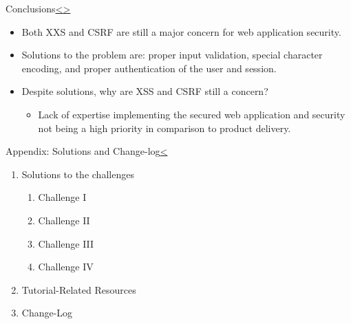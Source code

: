 \documentclass[12pt]{extarticle}
\newenvironment{instructionblock}{\Large\bgroup}{\egroup}
\newcommand{\ben}{\begin{enumerate}}
\newcommand{\een}{\end{enumerate}}
\begin{document}


\pagebreak
\begin{slide}{Conclusions}{\hyperref[slide 20]{\textless}\hyperref[slide 22]{\textgreater}}
	\begin{instructionblock}
		\begin{itemize}
			\item Both XXS and CSRF are still a major concern for web application security.
			\item Solutions to the problem are: proper input validation, special character encoding, and proper authentication of the user and session. 
			\item Despite solutions, why are XSS and CSRF still a concern?
			\begin{itemize}
				\item Lack of expertise implementing the secured web application and security not being a high priority in comparison to product delivery.
			\end{itemize}
		\end{itemize}
	\end{instructionblock}	
\end{slide}






\pagebreak	
\begin{slide}{Appendix: Solutions and Change-log}{\hyperref[slide 21]{\textless}}
	\begin{instructionblock}
		\begin{enumerate}
			\item {Solutions to the challenges}
				\ben
					\item Challenge I
					\item Challenge II
					\item Challenge III
					\item Challenge IV
				\een
			\item {Tutorial-Related Resources}
			\item {Change-Log}
		\end{enumerate}
	\end{instructionblock}
\end{slide}
\end{document}
